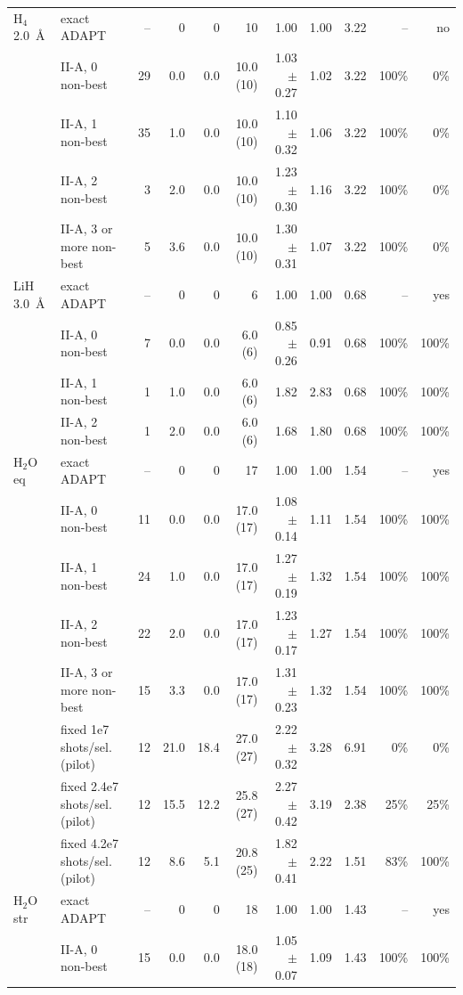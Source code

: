 \begin{table}[!htb]
\begin{tabular}{llrrrrrrrrr}
\midrule
H$_4$ 2.0~\AA & exact ADAPT & -- & 0 & 0 & 10 & 1.00 & 1.00 & 3.22 & -- & no \\
 & II-A, 0 non-best & 29 & 0.0 & 0.0 & 10.0 (10) & 1.03 $\pm$0.27 & 1.02 & 3.22 & 100\% & 0\% \\
 & II-A, 1 non-best & 35 & 1.0 & 0.0 & 10.0 (10) & 1.10 $\pm$0.32 & 1.06 & 3.22 & 100\% & 0\% \\
 & II-A, 2 non-best & 3 & 2.0 & 0.0 & 10.0 (10) & 1.23 $\pm$0.30 & 1.16 & 3.22 & 100\% & 0\% \\
 & II-A, 3 or more non-best & 5 & 3.6 & 0.0 & 10.0 (10) & 1.30 $\pm$0.31 & 1.07 & 3.22 & 100\% & 0\% \\
\midrule
LiH 3.0~\AA & exact ADAPT & -- & 0 & 0 & 6 & 1.00 & 1.00 & 0.68 & -- & yes \\
 & II-A, 0 non-best & 7 & 0.0 & 0.0 & 6.0 (6) & 0.85 $\pm$0.26 & 0.91 & 0.68 & 100\% & 100\% \\
 & II-A, 1 non-best & 1 & 1.0 & 0.0 & 6.0 (6) & 1.82 & 2.83 & 0.68 & 100\% & 100\% \\
 & II-A, 2 non-best & 1 & 2.0 & 0.0 & 6.0 (6) & 1.68 & 1.80 & 0.68 & 100\% & 100\% \\
\midrule
H$_2$O eq & exact ADAPT & -- & 0 & 0 & 17 & 1.00 & 1.00 & 1.54 & -- & yes \\
 & II-A, 0 non-best & 11 & 0.0 & 0.0 & 17.0 (17) & 1.08 $\pm$0.14 & 1.11 & 1.54 & 100\% & 100\% \\
 & II-A, 1 non-best & 24 & 1.0 & 0.0 & 17.0 (17) & 1.27 $\pm$0.19 & 1.32 & 1.54 & 100\% & 100\% \\
 & II-A, 2 non-best & 22 & 2.0 & 0.0 & 17.0 (17) & 1.23 $\pm$0.17 & 1.27 & 1.54 & 100\% & 100\% \\
 & II-A, 3 or more non-best & 15 & 3.3 & 0.0 & 17.0 (17) & 1.31 $\pm$0.23 & 1.32 & 1.54 & 100\% & 100\% \\
 & fixed 1e7 shots/sel. (pilot) & 12 & 21.0 & 18.4 & 27.0 (27) & 2.22 $\pm$0.32 & 3.28 & 6.91 & 0\% & 0\% \\
 & fixed 2.4e7 shots/sel. (pilot) & 12 & 15.5 & 12.2 & 25.8 (27) & 2.27 $\pm$0.42 & 3.19 & 2.38 & 25\% & 25\% \\
 & fixed 4.2e7 shots/sel. (pilot) & 12 & 8.6 & 5.1 & 20.8 (25) & 1.82 $\pm$0.41 & 2.22 & 1.51 & 83\% & 100\% \\
\midrule
H$_2$O str & exact ADAPT & -- & 0 & 0 & 18 & 1.00 & 1.00 & 1.43 & -- & yes \\
 & II-A, 0 non-best & 15 & 0.0 & 0.0 & 18.0 (18) & 1.05 $\pm$0.07 & 1.09 & 1.43 & 100\% & 100\% \\

\end{tabular}
\end{table}
